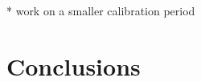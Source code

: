 \documentclass[draft]{agujournal2019}
\begin{document}
* work on a smaller calibration period


\section{Conclusions}
\label{conclusions}




%
%
%
%
%
%
%
%
%
%

%
%
\end{document}
